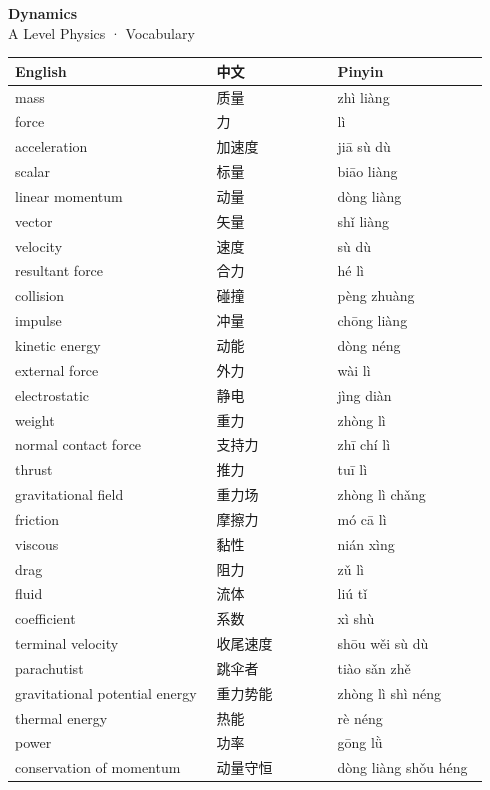 \documentclass[11pt]{article}
\begin{document}
\begin{center}
  {\LARGE\bfseries Dynamics}\\[0.35em]
  {\large A Level Physics · Vocabulary}
\end{center}
\vspace{0.6em}

\begin{longtable}{@{}p{0.40\linewidth}p{0.24\linewidth}p{0.30\linewidth}@{}}
\toprule
\textbf{English} & \textbf{中文} & \textbf{Pinyin} \\
\midrule
\endhead
\bottomrule
\endlastfoot
mass & 质量 & zhì liàng \\
force & 力 & lì \\
acceleration & 加速度 & jiā sù dù \\
scalar & 标量 & biāo liàng \\
linear momentum & 动量 & dòng liàng \\
vector & 矢量 & shǐ liàng \\
velocity & 速度 & sù dù \\
resultant force & 合力 & hé lì \\
collision & 碰撞 & pèng zhuàng \\
impulse & 冲量 & chōng liàng \\
kinetic energy & 动能 & dòng néng \\
external force & 外力 & wài lì \\
electrostatic & 静电 & jìng diàn \\
weight & 重力 & zhòng lì \\
normal contact force & 支持力 & zhī chí lì \\
thrust & 推力 & tuī lì \\
gravitational field & 重力场 & zhòng lì chǎng \\
friction & 摩擦力 & mó cā lì \\
viscous & 黏性 & nián xìng \\
drag & 阻力 & zǔ lì \\
fluid & 流体 & liú tǐ \\
coefficient & 系数 & xì shù \\
terminal velocity & 收尾速度 & shōu wěi sù dù \\
parachutist & 跳伞者 & tiào sǎn zhě \\
gravitational potential energy & 重力势能 & zhòng lì shì néng \\
thermal energy & 热能 & rè néng \\
power & 功率 & gōng lǜ \\
conservation of momentum & 动量守恒 & dòng liàng shǒu héng \\

\end{longtable}
\end{document}
